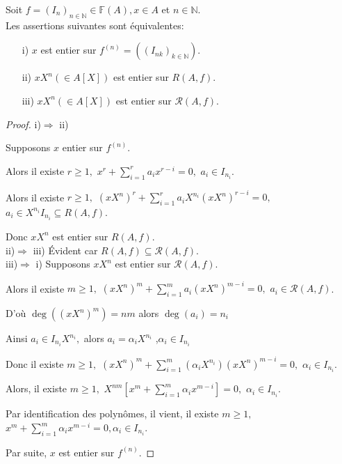 \begin{maproposition}
	\label{maprop1}
	Soit $f=(I_n)_{n \in \mathbb{N}} \in \mathbb{F}(A), x \in A $ et $n \in \mathbb{N}$.\\
	Les assertions suivantes sont équivalentes: \\
	\begin{enumerate}
		\item[i)] $x$ est entier sur $f^{(n)}=((I_{nk})_{k \in \mathbb{N}})$.
		\item[ii)] $xX^n(\in A[X])$ est entier sur $R(A,f)$.
		\item[iii)] $xX^n(\in A[X])$ est entier sur $ \mathcal{R}(A,f)$.
	\end{enumerate}
	\begin{proof}
		i)$\Rightarrow$ ii)
		
		Supposons $x$ entier sur $f^{(n)}$.
		
		Alors il existe $r\geq 1,$ $x^{r}+\sum\limits_{i=1}^{r}a_{i}x^{r-i}=0,$ $%
		a_{i}\in I_{n_{i}}$.
		
		Alors il existe $r\geq 1,$ $(xX^{n})^{r}+\sum%
		\limits_{i=1}^{r}a_{i}X^{n_{i}}(xX^{n})^{r-i}=0,$ $a_{i}\in
		X^{n_{i}}I_{n_{i}}\subseteq R(A,f)$.
		
		Donc $xX^{n}$ est entier sur $R(A,f).$ \\
		
		ii)$\Rightarrow$ iii) Évident car $R(A,f)\subseteq \mathcal{R}(A,f).$ \\
		iii)$\Rightarrow$ i) Supposons $xX^{n}$ est entier sur $\mathcal{R}(A,f).$
		
		Alors il existe $m\geq 1,$ $(xX^{n})^{m}+\sum\limits_{i=1}^{m}a_{i}(xX^{n})^{m-i}=0,$ $a_{i}\in \mathcal{R}(A,f)$.
		
		D'où $\deg ((xX^{n})^{m})=nm$ alors $\deg (a_{i})=n_{i}$
		
		Ainsi $a_{i}\in I_{n_{i}}X^{n_{i}},$ alors $a_{i}=\alpha _{i}X^{n_{i}}$ ,$\alpha _{i}\in I_{n_{i}}$
		
		Donc il existe $m\geq 1,$ $(xX^{n})^{m}+\sum\limits_{i=1}^{m}(\alpha
		_{i}X^{n_{i}})(xX^{n})^{m-i}=0,$ $\alpha _{i}\in I_{n_{i}}$.
		
		Alors, il existe $m\geq 1,$ $X^{nm}[x^{m}+\sum\limits_{i=1}^{m}\alpha
		_{i}x^{m-i}]=0,$ $\alpha _{i}\in I_{n_{i}}$.
		
		Par identification des polynômes, il vient, il existe $m\geq 1,$ $%
		x^{m}+\sum\limits_{i=1}^{m}\alpha _{i}x^{m-i}=0,\alpha _{i}\in I_{n_{i}}$.
		
		Par suite, $x$ est entier sur $f^{(n)}$.
	\end{proof}
\end{maproposition}
